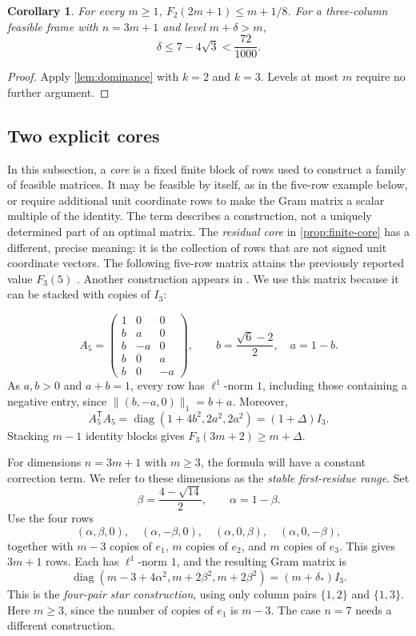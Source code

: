 \documentclass[11pt]{article}
\numberwithin{equation}{section}
\newtheorem{corollary}[corollary]{Corollary}
\theoremstyle{definition}
\theoremstyle{definition}
\newcommand{\F}{F_3}
\DeclareMathOperator{\diag}{diag}
\newcommand{\ds}{\delta_*}
\newcommand{\Dlt}{\Delta}
\begin{document}
\begin{corollary}\label{cor:two-dimensional}
For every $m\ge1$, $F_2(2m+1)\le m+1/8$.
For a three-column feasible frame with $n=3m+1$ and level $m+\delta>m$,
\[
 \delta\le7-4\sqrt3<\frac{72}{1000}.
\]
\end{corollary}
\begin{proof}
Apply \cref{lem:dominance} with $k=2$ and $k=3$.
Levels at most $m$ require no further argument.
\end{proof}

\subsection{Two explicit cores}
In this subsection, a \emph{core} is a fixed finite block of rows
used to construct a family of feasible matrices. It may be feasible
by itself, as in the five-row example below, or require additional
unit coordinate rows to make the Gram matrix a scalar multiple of
the identity. The term describes a construction, not a uniquely
determined part of an optimal matrix. The \emph{residual core} in
\cref{prop:finite-core} has a different, precise meaning: it is the
collection of rows that are not signed unit coordinate vectors.
The following five-row matrix attains the previously reported value $F_3(5)$
\cite{Finch2003}.  Another construction appears in \cite{Firsching2014}.
We use this matrix because it can be stacked with copies of $I_3$:

\begin{equation}\label{eq:five-core}
 A_5=\begin{pmatrix}
 1&0&0\\ b&a&0\\ b&-a&0\\ b&0&a\\ b&0&-a
 \end{pmatrix},\qquad
 b=\frac{\sqrt6-2}{2},\quad a=1-b.
\end{equation}
As $a,b>0$ and $a+b=1$, every row has $\ell^1$-norm $1$,
including those containing a negative entry, since
$\|(b,-a,0)\|_1=b+a$.  Moreover,
\[
 A_5^{\mathsf T}A_5
 =\diag(1+4b^2,2a^2,2a^2)=(1+\Dlt)I_3.
\]
Stacking $m-1$ identity blocks gives $\F(3m+2)\ge m+\Dlt$.

For dimensions $n=3m+1$ with $m\ge3$, the formula will have a
constant correction term. We refer to these dimensions as the
\emph{stable first-residue range}. Set
\[
 \beta=\frac{4-\sqrt{14}}2,\qquad \alpha=1-\beta.
\]
Use the four rows
\begin{equation}\label{eq:star-mixed}
 (\alpha,\beta,0),\quad(\alpha,-\beta,0),\quad
 (\alpha,0,\beta),\quad(\alpha,0,-\beta),
\end{equation}
together with $m-3$ copies of $e_1$, $m$ copies of $e_2$, and $m$ copies
of $e_3$. This gives $3m+1$ rows. Each has $\ell^1$-norm $1$, and the
resulting Gram matrix is
\[
 \diag(m-3+4\alpha^2,m+2\beta^2,m+2\beta^2)
 =(m+\ds)I_3.
\]
This is the \emph{four-pair star construction}, using only column
pairs $\{1,2\}$ and $\{1,3\}$.
Here $m\ge3$, since the number of copies of $e_1$ is $m-3$.
The case $n=7$ needs a different construction.
\end{document}
